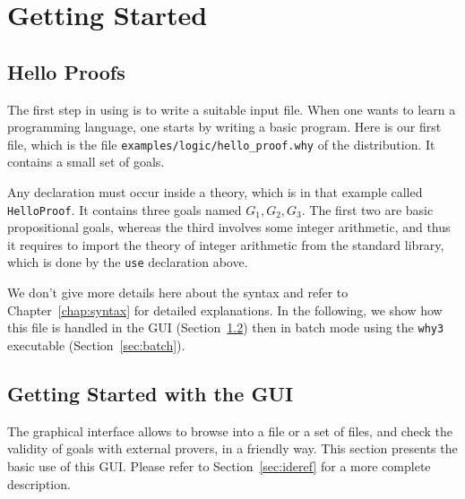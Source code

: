 \chapter{Getting Started}
\label{chap:starting}

\section{Hello Proofs}

The first step in using \why is to write a suitable input
file. When one wants to learn a programming language, one starts by
writing a basic program. Here is our first \why file, which is the file
\texttt{examples/logic/hello\_proof.why} of the distribution.
It contains a small set of goals.


Any declaration must occur
inside a theory, which is in that example called \texttt{HelloProof}.
It contains three goals
named $G_1,G_2,G_3$. The first two are basic propositional goals,
whereas the third involves some integer arithmetic, and thus it
requires to import the theory of integer arithmetic from the \why
standard library, which is done by the \texttt{use} declaration above.

We don't give more details here about the syntax and refer to
Chapter~\ref{chap:syntax} for detailed explanations. In the following,
we show how this file is handled in the \why GUI
(Section~\ref{sec:gui}) then in batch mode using the \texttt{why3}
executable (Section~\ref{sec:batch}).


\section{Getting Started with the GUI}
\label{sec:gui}

The graphical interface allows to browse into a file or a set of
files, and check the validity of goals with external provers, in a
friendly way. This section presents the basic use of this GUI. Please
refer to Section~\ref{sec:ideref} for a more complete description.

